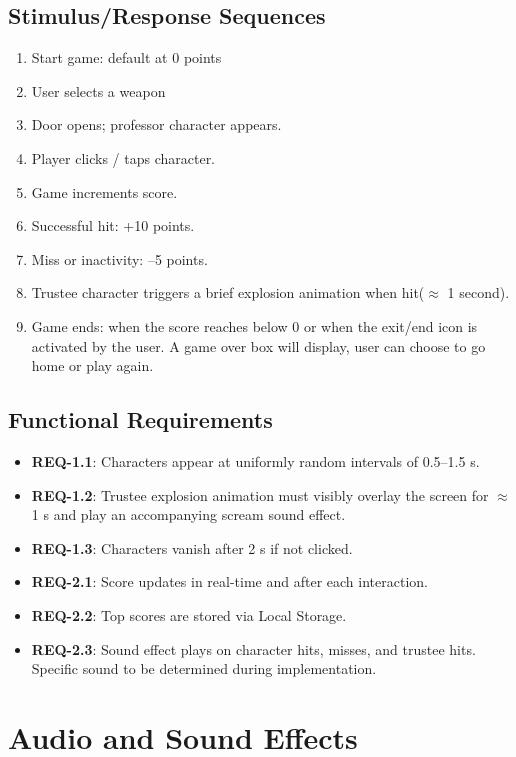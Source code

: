 \documentclass[11pt]{scrreprt}
\begin{document}
\subsection{Stimulus/Response Sequences}
\begin{enumerate}
  \item Start game: default at 0 points
  \item User selects a weapon
  \item Door opens; professor character appears.
  \item Player clicks / taps character.
  \item Game increments score.
  \item Successful hit: +10 points.
  \item Miss or inactivity: –5 points.
  \item Trustee  character triggers a brief explosion animation when hit($\approx$ 1 second).
  \item Game ends: when the score reaches below 0 or when the exit/end icon is activated by the user. A game over box will display, user can choose to go home or play again.
\end{enumerate}

\subsection{Functional Requirements}
\begin{itemize}
  \item \textbf{REQ-1.1}: Characters appear at uniformly random intervals of 0.5–1.5 s.
  \item \textbf{REQ-1.2}: Trustee explosion animation must visibly overlay the screen for $\approx$ 1 s and play an accompanying scream sound effect.
  \item \textbf{REQ-1.3}: Characters vanish after 2 s if not clicked.
  \item \textbf{REQ-2.1}: Score updates in real-time and after each interaction.
  \item \textbf{REQ-2.2}: Top scores are stored via Local Storage.
  \item \textbf{REQ-2.3}: Sound effect plays on character hits, misses, and trustee hits. Specific sound to be determined during implementation.
\end{itemize}

\section{Audio and Sound Effects}
\end{document}
